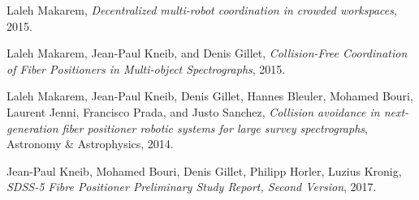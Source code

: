 \begin{thebibliography}{9}

   Laleh Makarem,
    \textit{Decentralized multi-robot coordination in crowded workspaces},
	2015.

	Laleh Makarem, Jean-Paul Kneib, and Denis Gillet,
    \textit{Collision-Free Coordination of Fiber Positioners in Multi-object Spectrographs},
    2015.

   Laleh Makarem, Jean-Paul Kneib, Denis Gillet, Hannes Bleuler, Mohamed Bouri, Laurent Jenni, Francisco Prada, and Justo Sanchez,
    \textit{Collision avoidance in next-generation fiber positioner robotic systems for large survey spectrographs},
    Astronomy \& Astrophysics,
    2014.

	Jean-Paul Kneib, Mohamed Bouri, Denis Gillet, Philipp Horler, Luzius Kronig,
    \textit{SDSS-5 Fibre Positioner Preliminary Study Report, Second Version},
    2017.

\end{thebibliography}
